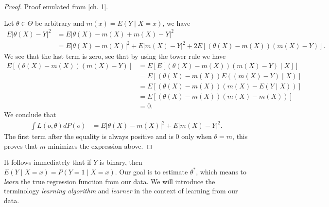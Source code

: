 \documentclass[11pt, a4paper]{article}
\theoremstyle{definition}
\theoremstyle{remark}
\newcommand{\btheta}{\theta}
\begin{document}
\begin{proof}
    Proof emulated from \parencite{gyorfi2002distribution}[ch. 1]. 

    Let $ \btheta \in \Theta $ be arbitrary and $ m(x) = E(Y \mid X = x) $, we have 
    \begin{align*}
        E| \theta(X) - Y |^2 &= E| \theta(X) - m(X) + m(X) - Y |^2 \\
                             &= E| \theta(X) - m(X) |^2 + E| m(X) - Y |^2 + 2 E[ (\theta(X) - m(X))(m(X) - Y) ].
    \end{align*}
    We see that the last term is zero, see that by using the tower rule we have 
    \begin{align*}
        E[ (\theta(X) - m(X))(m(X) - Y) ] &= E[ E[ (\theta(X) - m(X))(m(X) - Y) \mid X] ] \\
                                                       &= E[ (\theta(X) - m(X)) E( (m(X) - Y) \mid X) ] \\
                                                       &= E[ (\theta(X) - m(X)) ( m(X) - E(Y \mid X)) ] \\
                                                       &= E[ (\theta(X) - m(X)) ( m(X) - m(X)) ] \\
                                                       &= 0.
    \end{align*}
    We conclude that
    \begin{align*}
        \int L(o, \theta) d P(o) &= E| \theta(X) - m(X) |^2 + E | m(X) - Y |^2.
    \end{align*}
    The first term after the equality is always positive and is $ 0 $ only when $ \theta = m $, this proves that $ m $ minimizes the expression above. 
\end{proof}
It follows immediately that if $ Y $ is binary, then $ E(Y \mid X = x) = P(Y = 1 \mid X = x) $. Our goal is to estimate $ \btheta^{*} $, which means to \textit{learn} the true regression function from our data. We will introduce the terminology \textit{learning algorithm} and \textit{learner} in the context of learning from our data.  
\end{document}
